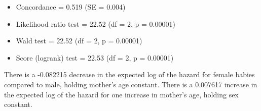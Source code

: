 \documentclass[12pt,letterpaper]{article}
\begin{document}
		\begin{itemize}
			\item Concordance = 0.519 (SE = 0.004)
			\item Likelihood ratio test = 22.52 (df = 2, p = 0.00001)
			\item Wald test = 22.52 (df = 2, p = 0.00001)
			\item Score (logrank) test = 22.53 (df = 2, p = 0.00001)
		\end{itemize}
		
		There is a -0.082215 decrease in the expected log of the hazard for female babies compared to male, holding mother’s age constant. There is a 0.007617 increase in the expected log of the hazard for one increase in mother’s age, holding sex constant.
		
\end{document}
